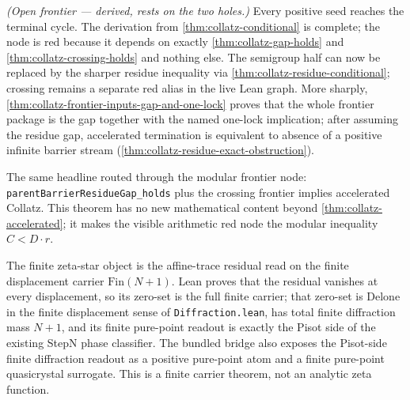 \begin{theorem}
  \label{thm:collatz-accelerated}
  \notready
  \emph{(Open frontier --- derived, rests on the two holes.)} Every positive seed reaches the
  terminal cycle. The derivation from \cref{thm:collatz-conditional} is complete; the node is
  red because it depends on exactly \cref{thm:collatz-gap-holds} and
  \cref{thm:collatz-crossing-holds} and nothing else. The semigroup half can now be replaced by
  the sharper residue inequality via \cref{thm:collatz-residue-conditional}; crossing remains a
  separate red alias in the live Lean graph. More sharply,
  \cref{thm:collatz-frontier-inputs-gap-and-one-lock} proves that the whole frontier package is
  the gap together with the named one-lock implication; after assuming the residue gap,
  accelerated termination is equivalent to absence of a positive infinite barrier stream
  (\cref{thm:collatz-residue-exact-obstruction}).
\end{theorem}
\begin{theorem}
  \label{thm:collatz-residue-frontier-accelerated}
  \notready
  The same headline routed through the modular frontier node:
  \texttt{parentBarrierResidueGap\_holds} plus the crossing frontier implies
  accelerated Collatz. This theorem has no new mathematical content beyond
  \cref{thm:collatz-accelerated}; it makes the visible arithmetic red node the
  modular inequality \(C<D\cdot r\).
\end{theorem}

\begin{theorem}
  \label{thm:arithmetic-zeta-star-finite-bridge}
  \leanok
  The finite zeta-star object is the affine-trace residual read on the finite
  displacement carrier \(\mathrm{Fin}(N+1)\).  Lean proves that the residual
  vanishes at every displacement, so its zero-set is the full finite carrier;
  that zero-set is Delone in the finite displacement sense of
  \texttt{Diffraction.lean}, has total finite diffraction mass \(N+1\), and its
  finite pure-point readout is exactly the Pisot side of the existing StepN
  phase classifier.  The bundled bridge also exposes the Pisot-side finite
  diffraction readout as a positive pure-point atom and a finite pure-point
  quasicrystal surrogate.  This is a finite carrier theorem, not an analytic
  zeta function.
\end{theorem}

